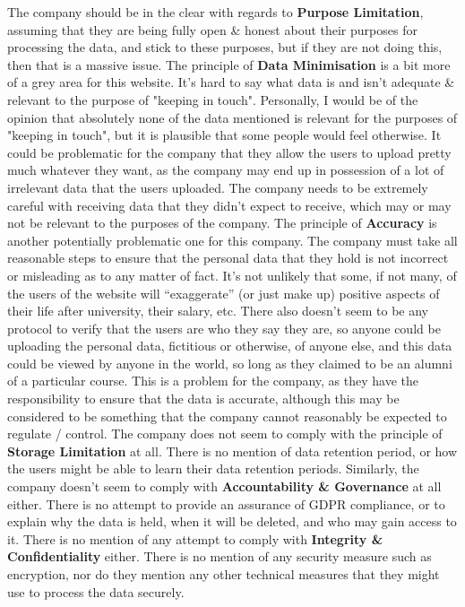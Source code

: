 \documentclass[a4paper]{article}
\begin{document}
The company should be in the clear with regards to \textbf{Purpose Limitation}, assuming that they are being fully open \& honest about their purposes for processing the data, and stick to these purposes, but if they are not doing this, then that is a massive issue.
\newline\newline
The principle of \textbf{Data Minimisation} is a bit more of a grey area for this website.
It's hard to say what data is and isn't adequate \& relevant to the purpose of "keeping in touch".
Personally, I would be of the opinion that absolutely none of the data mentioned is relevant for the purposes of "keeping in touch", but it is plausible that some people would feel otherwise.
It could be problematic for the company that they allow the users to upload pretty much whatever they want, as the company may end up in possession of a lot of irrelevant data that the users uploaded.
The company needs to be extremely careful with receiving data that they didn't expect to receive, which may or may not be relevant to the purposes of the company.
\newline\newline
The principle of \textbf{Accuracy} is another potentially problematic one for this company.
The company must take all reasonable steps to ensure that the personal data that they hold is not incorrect or misleading as to any matter of fact.
It's not unlikely that some, if not many, of the users of the website will ``exaggerate'' (or just make up) positive aspects of their life after university, their salary, etc.
There also doesn't seem to be any protocol to verify that the users are who they say they are, so anyone could be uploading the personal data, fictitious or otherwise, of anyone else, and this data could be viewed by anyone in the world, so long as they claimed to be an alumni of a particular course.
This is a problem for the company, as they have the responsibility to ensure that the data is accurate, although this may be considered to be something that the company cannot reasonably be expected to regulate / control.
\newline\newline
The company does not seem to comply with the principle of \textbf{Storage Limitation} at all.
There is no mention of data retention period, or how the users might be able to learn their data retention periods. 
\newline\newline
Similarly, the company doesn't seem to comply with \textbf{Accountability \& Governance} at all either. 
There is no attempt to provide an assurance of GDPR compliance, or to explain why the data is held, when it will be deleted, and who may gain access to it.
\newline\newline
There is no mention of any attempt to comply with \textbf{Integrity \& Confidentiality} either.
There is no mention of any security measure such as encryption, nor do they mention any other technical measures that they might use to process the data securely.
\end{document}
